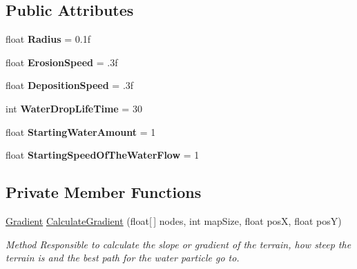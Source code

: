 \subsection*{Public Attributes}
\begin{DoxyCompactItemize}
\item 
\mbox{\label{class_assets_1_1_scripts_1_1_erosion_a406440f0f77b8177d5754da8ec4d285d}} 
float {\bfseries Radius} = 0.\+1f
\item 
\mbox{\label{class_assets_1_1_scripts_1_1_erosion_a7cfb294ed0d6bfcf22547a839f119550}} 
float {\bfseries Erosion\+Speed} = .\+3f
\item 
\mbox{\label{class_assets_1_1_scripts_1_1_erosion_a2226b84b5a9f2701c096d660f9fdc5ec}} 
float {\bfseries Deposition\+Speed} = .\+3f
\item 
\mbox{\label{class_assets_1_1_scripts_1_1_erosion_adeab8d43b57014d421cc2828c3167758}} 
int {\bfseries Water\+Drop\+Life\+Time} = 30
\item 
\mbox{\label{class_assets_1_1_scripts_1_1_erosion_a0e7a9fec86d88119d83f382d161ed81c}} 
float {\bfseries Starting\+Water\+Amount} = 1
\item 
\mbox{\label{class_assets_1_1_scripts_1_1_erosion_a4fff926bbec51b5e825ed01207792f54}} 
float {\bfseries Starting\+Speed\+Of\+The\+Water\+Flow} = 1
\end{DoxyCompactItemize}
\subsection*{Private Member Functions}
\begin{DoxyCompactItemize}
\item 
\mbox{\hyperlink{struct_assets_1_1_scripts_1_1_gradient}{Gradient}} \mbox{\hyperlink{class_assets_1_1_scripts_1_1_erosion_a7c26866a0dce3f28f17e8736c0e8e968}{Calculate\+Gradient}} (float\mbox{[}$\,$\mbox{]} nodes, int map\+Size, float posX, float posY)
\begin{DoxyCompactList}\small\item\em Method Responsible to calculate the slope or gradient of the terrain, how steep the terrain is and the best path for the water particle go to. \end{DoxyCompactList}\end{DoxyCompactItemize}
